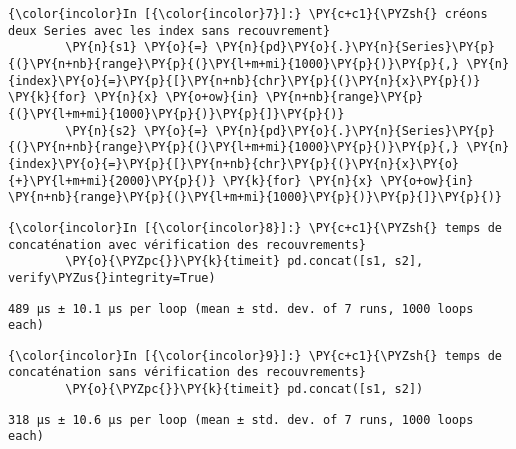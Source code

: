     \begin{Verbatim}[commandchars=\\\{\},frame=single,framerule=0.3mm,rulecolor=\color{cellframecolor}]
{\color{incolor}In [{\color{incolor}7}]:} \PY{c+c1}{\PYZsh{} créons deux Series avec les index sans recouvrement}
        \PY{n}{s1} \PY{o}{=} \PY{n}{pd}\PY{o}{.}\PY{n}{Series}\PY{p}{(}\PY{n+nb}{range}\PY{p}{(}\PY{l+m+mi}{1000}\PY{p}{)}\PY{p}{,} \PY{n}{index}\PY{o}{=}\PY{p}{[}\PY{n+nb}{chr}\PY{p}{(}\PY{n}{x}\PY{p}{)} \PY{k}{for} \PY{n}{x} \PY{o+ow}{in} \PY{n+nb}{range}\PY{p}{(}\PY{l+m+mi}{1000}\PY{p}{)}\PY{p}{]}\PY{p}{)}
        \PY{n}{s2} \PY{o}{=} \PY{n}{pd}\PY{o}{.}\PY{n}{Series}\PY{p}{(}\PY{n+nb}{range}\PY{p}{(}\PY{l+m+mi}{1000}\PY{p}{)}\PY{p}{,} \PY{n}{index}\PY{o}{=}\PY{p}{[}\PY{n+nb}{chr}\PY{p}{(}\PY{n}{x}\PY{o}{+}\PY{l+m+mi}{2000}\PY{p}{)} \PY{k}{for} \PY{n}{x} \PY{o+ow}{in} \PY{n+nb}{range}\PY{p}{(}\PY{l+m+mi}{1000}\PY{p}{)}\PY{p}{]}\PY{p}{)}
\end{Verbatim}


    \begin{Verbatim}[commandchars=\\\{\},frame=single,framerule=0.3mm,rulecolor=\color{cellframecolor}]
{\color{incolor}In [{\color{incolor}8}]:} \PY{c+c1}{\PYZsh{} temps de concaténation avec vérification des recouvrements}
        \PY{o}{\PYZpc{}}\PY{k}{timeit} pd.concat([s1, s2], verify\PYZus{}integrity=True)
\end{Verbatim}


    \begin{Verbatim}[commandchars=\\\{\},frame=single,framerule=0.3mm,rulecolor=\color{cellframecolor}]
489 µs ± 10.1 µs per loop (mean ± std. dev. of 7 runs, 1000 loops each)
\end{Verbatim}

    \begin{Verbatim}[commandchars=\\\{\},frame=single,framerule=0.3mm,rulecolor=\color{cellframecolor}]
{\color{incolor}In [{\color{incolor}9}]:} \PY{c+c1}{\PYZsh{} temps de concaténation sans vérification des recouvrements}
        \PY{o}{\PYZpc{}}\PY{k}{timeit} pd.concat([s1, s2])
\end{Verbatim}


    \begin{Verbatim}[commandchars=\\\{\},frame=single,framerule=0.3mm,rulecolor=\color{cellframecolor}]
318 µs ± 10.6 µs per loop (mean ± std. dev. of 7 runs, 1000 loops each)
\end{Verbatim}

